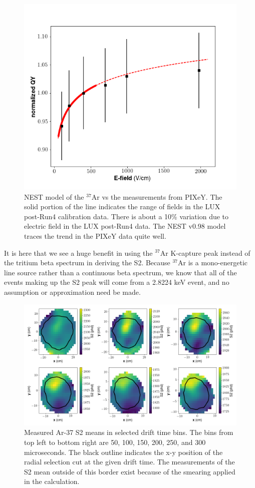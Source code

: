 \begin{figure}[h!]
\centering
\includegraphics[width=150mm]{Figures/pixey_Ar_v_ef.png}
\caption{NEST model of the $^{37}$Ar vs the measurements from PIXeY\cite{pixey_ar37}. The solid portion of the line indicates the range of fields in the LUX post-Run4 calibration data. There is about a 10\% variation due to electric field in the LUX post-Run4 data. The NEST v0.98 model traces the trend in the PIXeY data quite well.}
\label{fig:pixey_Ar_v_ef} 
\end{figure}
It is here that we see a huge benefit in using the $^{37}$Ar K-capture peak instead of the tritium beta spectrum in deriving the S2. Because $^{37}$Ar is a mono-energetic line source rather than a continuous beta spectrum, we know that all of the events making up the S2 peak will come from a 2.8224 keV event, and no assumption or approximation need be made. 
\begin{figure}[h!]
\centering
\includegraphics[width=150mm]{Figures/S2map_xy.png}
\caption{Measured Ar-37 S2 means in selected drift time bins. The bins from top left to bottom right are 50, 100, 150, 200, 250, and 300 microseconds. The black outline indicates the x-y position of the radial selection cut at the given drift time. The measurements of the S2 mean outside of this border exist because of the smearing applied in the calculation. }
\label{fig:S2map_xy} 
\end{figure}

